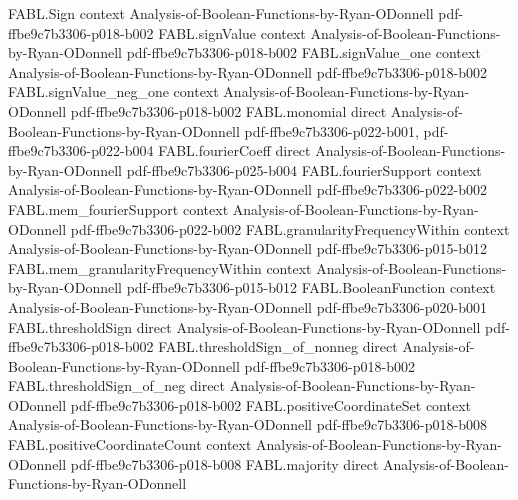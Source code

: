 \begin{theorem}
\label{FABL.discreteDerivative_dependsOn_compl_singleton}
\leanok
{}
\proofstep
  {FABL.Sign}
  {context}
  {Analysis-of-Boolean-Functions-by-Ryan-ODonnell}
  {pdf-ffbe9c7b3306-p018-b002}
\proofstep
  {FABL.signValue}
  {context}
  {Analysis-of-Boolean-Functions-by-Ryan-ODonnell}
  {pdf-ffbe9c7b3306-p018-b002}
\proofstep
  {FABL.signValue_one}
  {context}
  {Analysis-of-Boolean-Functions-by-Ryan-ODonnell}
  {pdf-ffbe9c7b3306-p018-b002}
\proofstep
  {FABL.signValue_neg_one}
  {context}
  {Analysis-of-Boolean-Functions-by-Ryan-ODonnell}
  {pdf-ffbe9c7b3306-p018-b002}
\proofstep
  {FABL.monomial}
  {direct}
  {Analysis-of-Boolean-Functions-by-Ryan-ODonnell}
  {pdf-ffbe9c7b3306-p022-b001,
    pdf-ffbe9c7b3306-p022-b004}
\proofstep
  {FABL.fourierCoeff}
  {direct}
  {Analysis-of-Boolean-Functions-by-Ryan-ODonnell}
  {pdf-ffbe9c7b3306-p025-b004}
\proofstep
  {FABL.fourierSupport}
  {context}
  {Analysis-of-Boolean-Functions-by-Ryan-ODonnell}
  {pdf-ffbe9c7b3306-p022-b002}
\proofstep
  {FABL.mem_fourierSupport}
  {context}
  {Analysis-of-Boolean-Functions-by-Ryan-ODonnell}
  {pdf-ffbe9c7b3306-p022-b002}
\proofstep
  {FABL.granularityFrequencyWithin}
  {context}
  {Analysis-of-Boolean-Functions-by-Ryan-ODonnell}
  {pdf-ffbe9c7b3306-p015-b012}
\proofstep
  {FABL.mem_granularityFrequencyWithin}
  {context}
  {Analysis-of-Boolean-Functions-by-Ryan-ODonnell}
  {pdf-ffbe9c7b3306-p015-b012}
\proofstep
  {FABL.BooleanFunction}
  {context}
  {Analysis-of-Boolean-Functions-by-Ryan-ODonnell}
  {pdf-ffbe9c7b3306-p020-b001}
\proofstep
  {FABL.thresholdSign}
  {direct}
  {Analysis-of-Boolean-Functions-by-Ryan-ODonnell}
  {pdf-ffbe9c7b3306-p018-b002}
\proofstep
  {FABL.thresholdSign_of_nonneg}
  {direct}
  {Analysis-of-Boolean-Functions-by-Ryan-ODonnell}
  {pdf-ffbe9c7b3306-p018-b002}
\proofstep
  {FABL.thresholdSign_of_neg}
  {direct}
  {Analysis-of-Boolean-Functions-by-Ryan-ODonnell}
  {pdf-ffbe9c7b3306-p018-b002}
\proofstep
  {FABL.positiveCoordinateSet}
  {context}
  {Analysis-of-Boolean-Functions-by-Ryan-ODonnell}
  {pdf-ffbe9c7b3306-p018-b008}
\proofstep
  {FABL.positiveCoordinateCount}
  {context}
  {Analysis-of-Boolean-Functions-by-Ryan-ODonnell}
  {pdf-ffbe9c7b3306-p018-b008}
\proofstep
  {FABL.majority}
  {direct}
  {Analysis-of-Boolean-Functions-by-Ryan-ODonnell}

\end{theorem}
